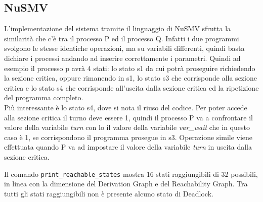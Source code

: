 \documentclass[a4paper]{article}
\begin{document}
\subsection{NuSMV}
L'implementazione del sistema tramite il linguaggio di NuSMV sfrutta la similarità che c'è tra il processo P ed il processo Q.
Infatti i due programmi svolgono le stesse identiche operazioni, ma su variabili differenti, quindi basta dichiare i processi andando ad inserire correttamente i parametri.
Quindi ad esempio il processo p avrà 4 stati: lo stato s1 da cui potrà proseguire richiedendo la sezione critica, oppure rimanendo in s1, lo stato s3 che corrisponde alla sezione critica e lo stato s4 che corrisponde all'uscita dalla sezione critica ed la ripetizione del programma completo.\\
Più interessante è lo stato s4, dove si nota il riuso del codice. 
Per poter accede alla sezione critica il turno deve essere 1, quindi il processo P va a confrontare il valore della variabile \textit{turn} con lo il valore della variabile \textit{var\_wait} che in questo caso è 1, se corrispondono il programma prosegue in s3.
Operazione simile viene effettuata quando P va ad impostare il valore della variabile \textit{turn} in uscita dalla sezione critica.

Il comando \texttt{print\_reachable\_states} mostra 16 stati raggiungibili di 32 possibili, in linea con la dimensione del Derivation Graph e del Reachability Graph.
Tra tutti gli stati raggiungibili non è presente alcuno stato di Deadlock.

\newpage
\end{document}
